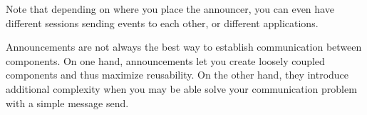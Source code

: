 \documentclass[a4paper,10pt,twoside]{book}
\begin{document}
Note that depending on where you place the announcer, you can even
have different sessions sending events to each other, or different
applications.

Announcements are not always the best way to establish communication
between components.  On one hand, announcements let you create loosely
coupled components and thus maximize reusability.  On the other hand,
they introduce additional complexity when you may be able solve your
communication problem with a simple message send.

\ifx\wholebook\relax\else
   
   
\end{document}
